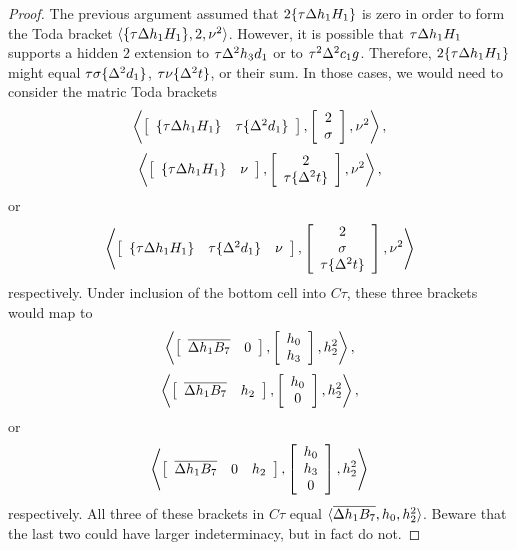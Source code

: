 {\begin{proof}
The previous argument assumed that $2 \{\tau \Delta h_1 H_1\}$ is zero
in order to form the Toda bracket
$\langle \{\tau \Delta h_1 H_1\}, 2, \nu^2 \rangle$.
However, it is possible that $\tau \Delta h_1 H_1$ supports a hidden
$2$ extension to $\tau \Delta^2 h_3 d_1$ or to $\tau^2 \Delta^2 c_1 g$.
Therefore, $2 \{\tau \Delta h_1 H_1\}$ might equal
$\tau \sigma \{\Delta^2 d_1\}$, $\tau \nu \{\Delta^2 t\}$, or their sum.
In those cases, we would need to consider the matric Toda brackets
\[
\left\langle 
\left[
\begin{array}{cc}
\{ \tau \Delta h_1 H_1\} & \tau \{\Delta^2 d_1\}
\end{array}
\right],
\left[
\begin{array}{c}
2 \\ \sigma
\end{array}
\right],
\nu^2
\right\rangle,
\]
\[
\left\langle 
\left[
\begin{array}{cc}
\{ \tau \Delta h_1 H_1\} & \nu
\end{array}
\right],
\left[
\begin{array}{c}
2 \\ \tau \{\Delta^2 t\}
\end{array}
\right],
\nu^2
\right\rangle,
\]
or
\[
\left\langle 
\left[
\begin{array}{ccc}
\{ \tau \Delta h_1 H_1\} & \tau \{\Delta^2 d_1\} & \nu
\end{array}
\right],
\left[
\begin{array}{c}
2 \\ \sigma \\ \tau \{\Delta^2 t \}
\end{array}
\right],
\nu^2
\right\rangle
\]
respectively.
Under inclusion of the bottom cell into $C\tau$, these three brackets
would map to
\[
\left\langle 
\left[
\begin{array}{cc}
\overline{\Delta h_1 B_7} & 0
\end{array}
\right],
\left[
\begin{array}{c}
h_0 \\ h_3
\end{array}
\right],
h_2^2
\right\rangle,
\]
\[
\left\langle 
\left[
\begin{array}{cc}
\overline{\Delta h_1 B_7} & h_2
\end{array}
\right],
\left[
\begin{array}{c}
h_0 \\ 0
\end{array}
\right],
h_2^2
\right\rangle,
\]
or
\[
\left\langle 
\left[
\begin{array}{ccc}
\overline{\Delta h_1 B_7} & 0 & h_2
\end{array}
\right],
\left[
\begin{array}{c}
h_0 \\ h_3 \\ 0
\end{array}
\right],
h_2^2
\right\rangle
\]
respectively.
All three of these brackets in $C\tau$ equal
$\langle \overline{\Delta h_1 B_7}, h_0, h_2^2 \rangle$.
Beware that the last two could have larger indeterminacy,
but in fact do not.
\end{proof}
}

